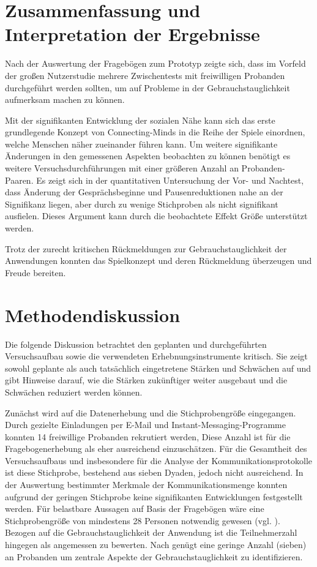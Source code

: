 \section{Zusammenfassung und Interpretation der Ergebnisse}
Nach der Auswertung der Fragebögen zum Prototyp zeigte sich, dass im Vorfeld der großen Nutzerstudie mehrere Zwischentests mit freiwilligen Probanden durchgeführt werden sollten, um auf Probleme in der Gebrauchstauglichkeit aufmerksam machen zu können. 

Mit der signifikanten Entwicklung der sozialen Nähe kann sich das erste grundlegende Konzept von Connecting-Minds in die Reihe der Spiele einordnen, welche Menschen näher zueinander führen kann. Um weitere signifikante Änderungen in den gemessenen Aspekten beobachten zu können benötigt es weitere Versuchsdurchführungen mit einer größeren Anzahl an Probanden-Paaren. Es zeigt sich in der quantitativen Untersuchung der Vor- und Nachtest, dass Änderung der Gesprächsbeginne und Pausenreduktionen nahe an der Signifikanz liegen, aber durch zu wenige Stichproben als nicht signifikant ausfielen. Dieses Argument kann durch die beobachtete Effekt Größe unterstützt werden. 

Trotz der zurecht kritischen Rückmeldungen zur Gebrauchstauglichkeit der Anwendungen konnten das Spielkonzept und deren Rückmeldung überzeugen und Freude bereiten.

\section{Methodendiskussion}
Die folgende Diskussion betrachtet den geplanten und durchgeführten Versuchsaufbau sowie die verwendeten Erhebnungsinstrumente kritisch. Sie zeigt sowohl geplante als auch tatsächlich eingetretene Stärken und Schwächen auf und gibt Hinweise darauf, wie die Stärken zukünftiger weiter ausgebaut und die Schwächen reduziert werden können.

Zunächst wird auf die Datenerhebung und die Stichprobengröße eingegangen.
Durch gezielte Einladungen per E-Mail und Instant-Messaging-Programme konnten 14 freiwillige Probanden rekrutiert werden, Diese Anzahl ist für die Fragebogenerhebung als eher ausreichend einzuschätzen. Für die Gesamtheit des Versuchsaufbaus und insbesondere für die Analyse der Kommunikationsprotokolle ist diese Stichprobe, bestehend aus sieben Dyaden, jedoch nicht ausreichend. In der Auswertung bestimmter Merkmale der Kommunikationsmenge konnten aufgrund der geringen Stichprobe keine signifikanten Entwicklungen festgestellt werden. Für belastbare Aussagen auf Basis der Fragebögen wäre eine Stichprobengröße von mindestens 28 Personen notwendig gewesen (vgl. \cite[S. 158]{cohen_power_1992}). 
Bezogen auf die Gebrauchstauglichkeit der Anwendung ist die Teilnehmerzahl hingegen als angemessen zu bewerten. Nach \cite[S. 3088]{turner_determining_2006} genügt eine geringe Anzahl (sieben) an Probanden um zentrale Aspekte der Gebrauchstauglichkeit zu identifizieren.

